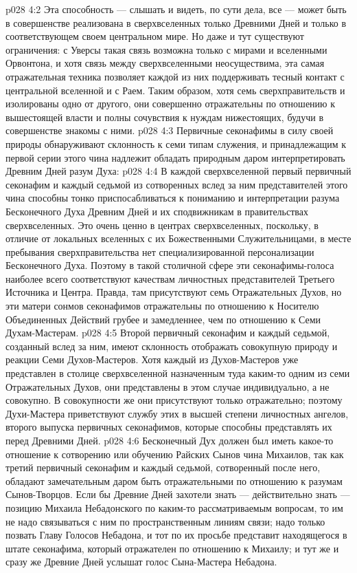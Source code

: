 \vs p028 4:2 Эта способность --- слышать и видеть, по сути дела, все --- может быть в совершенстве реализована в сверхвселенных только Древними Дней и только в соответствующем своем центральном мире. Но даже и тут существуют ограничения: с Уверсы такая связь возможна только с мирами и вселенными Орвонтона, и хотя связь между сверхвселенными неосуществима, эта самая отражательная техника позволяет каждой из них поддерживать тесный контакт с центральной вселенной и с Раем. Таким образом, хотя семь сверхправительств и изолированы одно от другого, они совершенно отражательны по отношению к вышестоящей власти и полны сочувствия к нуждам нижестоящих, будучи в совершенстве знакомы с ними.
\vs p028 4:3 \pc Первичные секонафимы в силу своей природы обнаруживают склонность к семи типам служения, и принадлежащим к первой серии этого чина надлежит обладать природным даром интерпретировать Древним Дней разум Духа:
\vs p028 4:4 \bibnobreakspace {} В каждой сверхвселенной первый первичный секонафим и каждый седьмой из сотворенных вслед за ним представителей этого чина способны тонко приспосабливаться к пониманию и интерпретации разума Бесконечного Духа Древним Дней и их сподвижникам в правительствах сверхвселенных. Это очень ценно в центрах сверхвселенных, поскольку, в отличие от локальных вселенных с их Божественными Служительницами, в месте пребывания сверхправительства нет специализированной персонализации Бесконечного Духа. Поэтому в такой столичной сфере эти секонафимы\hyp{}голоса наиболее всего соответствуют качествам личностных представителей Третьего Источника и Центра. Правда, там присутствуют семь Отражательных Духов, но эти матери сонмов секонафимов отражательны по отношению к Носителю Объединенных Действий грубее и замедленнее, чем по отношению к Семи Духам\hyp{}Мастерам.
\vs p028 4:5 \pc {}\bibnobreakspace {} Второй первичный секонафим и каждый седьмой, созданный вслед за ним, имеют склонность отображать совокупную природу и реакции Семи Духов\hyp{}Мастеров. Хотя каждый из Духов\hyp{}Мастеров уже представлен в столице сверхвселенной назначенным туда каким\hyp{}то одним из семи Отражательных Духов, они представлены в этом случае индивидуально, а не совокупно. В совокупности же они присутствуют только отражательно; поэтому Духи\hyp{}Мастера приветствуют службу этих в высшей степени личностных ангелов, второго выпуска первичных секонафимов, которые способны представлять их перед Древними Дней.
\vs p028 4:6 \pc {}\bibnobreakspace {} Бесконечный Дух должен был иметь какое\hyp{}то отношение к сотворению или обучению Райских Сынов чина Михаилов, так как третий первичный секонафим и каждый седьмой, сотворенный после него, обладают замечательным даром быть отражательными по отношению к разумам Сынов\hyp{}Творцов. Если бы Древние Дней захотели знать --- действительно знать --- позицию Михаила Небадонского по каким\hyp{}то рассматриваемым вопросам, то им не надо связываться с ним по пространственным линиям связи; надо только позвать Главу Голосов Небадона, и тот по их просьбе представит находящегося в штате секонафима, который отражателен по отношению к Михаилу; и тут же и сразу же Древние Дней услышат голос Сына\hyp{}Мастера Небадона.
